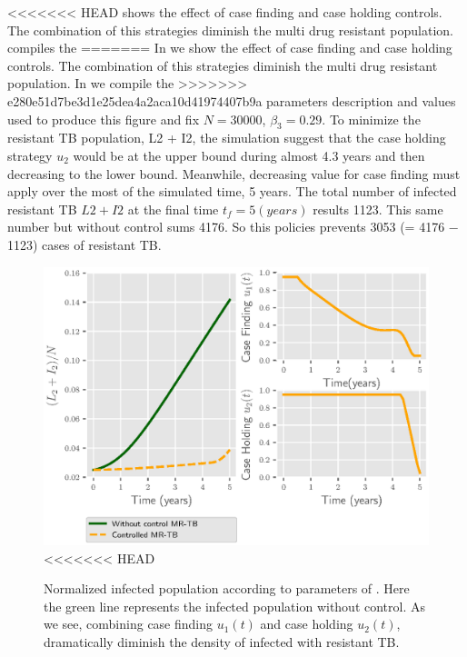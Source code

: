 <<<<<<< HEAD
	 shows the effect of case finding and 
case holding controls. The combination of this strategies diminish the multi 
drug resistant population.  compiles the 
=======
	In  we show the effect of case finding and 
case holding controls. The combination of this strategies diminish the multi 
drug resistant population. In  we compile the 
>>>>>>> e280e51d7be3d1e25dea4a2aca10d41974407b9a
parameters description and values used to produce this figure and fix 
$N = \num{30000}$, $\beta_3 = \num{0.29}$. To minimize the resistant TB 
population, L2 + I2, the simulation suggest that the case holding strategy 
$u_2$ would be at the upper bound during almost \num{4.3} years and then 
decreasing to the lower bound. Meanwhile, decreasing value for case finding
must apply over the most of the simulated time, 5 years. The total number of 
infected resistant TB $L2 + I2$  at the final time $t_f = 5(years)$ results
\num{1123}. This same number but without control sums 4176. So this policies 
prevents  \num{3053} (= 4176 − 1123) cases of resistant TB.


\begin{figure}
  \centering
  \includegraphics{Figures/figure_1_two_strain_tbm}
<<<<<<< HEAD
  \caption{Normalized infected population according to parameters of 
  . Here the green line represents the 
  infected population without control. As we see, combining case finding 
  $u_1(t)$ and  case holding $u_2(t)$, dramatically diminish the density of 
  infected with resistant TB.}
  \label{fig:figure1twostraintbm}
\end{figure}

